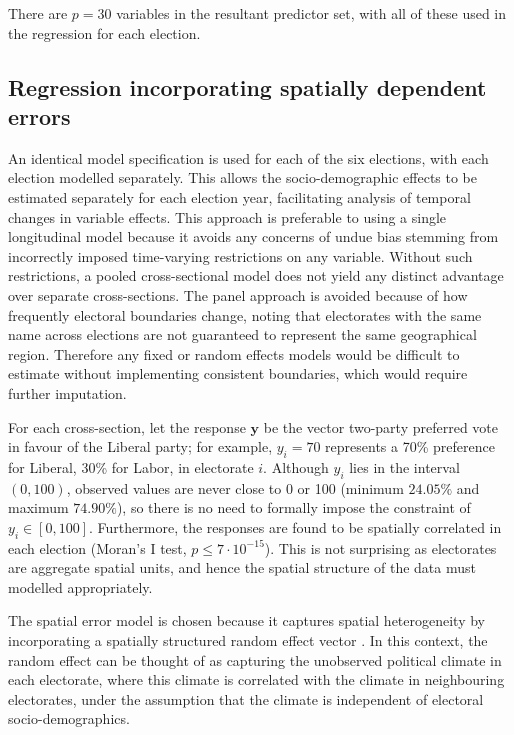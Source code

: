 \documentclass[11pt,a4paper,]{article}
\begin{document}
There are \(p=30\) variables in the resultant predictor set, with all of these used in the regression for each election.

\hypertarget{regression-incorporating-spatially-dependent-errors}{%
\subsection{Regression incorporating spatially dependent errors}\label{regression-incorporating-spatially-dependent-errors}}

An identical model specification is used for each of the six elections, with each election modelled separately. This allows the socio-demographic effects to be estimated separately for each election year, facilitating analysis of temporal changes in variable effects. This approach is preferable to using a single longitudinal model because it avoids any concerns of undue bias stemming from incorrectly imposed time-varying restrictions on any variable. Without such restrictions, a pooled cross-sectional model does not yield any distinct advantage over separate cross-sections. The panel approach is avoided because of how frequently electoral boundaries change, noting that electorates with the same name across elections are not guaranteed to represent the same geographical region. Therefore any fixed or random effects models would be difficult to estimate without implementing consistent boundaries, which would require further imputation.

For each cross-section, let the response \(\bm{y}\) be the vector two-party preferred vote in favour of the Liberal party; for example, \(y_i = 70\) represents a 70\% preference for Liberal, 30\% for Labor, in electorate \(i\). Although \(y_i\) lies in the interval \((0,100)\), observed values are never close to 0 or 100 (minimum \(24.05 \%\) and maximum \(74.90 \%\)), so there is no need to formally impose the constraint of \(y_i \in [0,100]\). Furthermore, the responses are found to be spatially correlated in each election (Moran's I test, \(p \le 7\cdot10^{-15}\)). This is not surprising as electorates are aggregate spatial units, and hence the spatial structure of the data must modelled appropriately.

The spatial error model \autocite{Anselin88} is chosen because it captures spatial heterogeneity by incorporating a spatially structured random effect vector \autocite{LeSage2009}. In this context, the random effect can be thought of as capturing the unobserved political climate in each electorate, where this climate is correlated with the climate in neighbouring electorates, under the assumption that the climate is independent of electoral socio-demographics.
\end{document}
